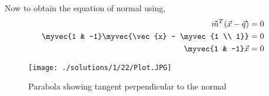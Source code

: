 Now to obtain the equation of normal using,
\begin{align}
    \vec{m}^T(\vec{x} - \vec{q}) &= 0 \\
    \myvec{1 & -1}\myvec{\vec{x} - \myvec{1 \\ 1}} &= 0 \\
    \myvec{1 & -1}\vec{x} &= 0 
\end{align}
\begin{figure}[h!]
\centering
\texttt{[image: ./solutions/1/22/Plot.JPG]}
\caption{{Parabola showing tangent perpendicular to the normal}}
\label{eq:solutions/1/22/myfig}
\end{figure}
